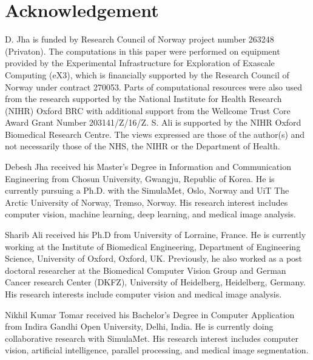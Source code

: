 \documentclass[journal]{IEEEtran}
\begin{document}
\section*{Acknowledgement}
D. Jha is funded by  Research Council of Norway project number 263248 (Privaton). The computations in this paper were performed on equipment provided by the Experimental Infrastructure for Exploration of Exascale Computing (eX3), which is financially supported by the Research Council of Norway under contract 270053. Parts of computational resources were also used from the research supported by the National Institute for Health Research (NIHR) Oxford BRC with additional support from the Wellcome Trust Core Award Grant Number 203141/Z/16/Z. S. Ali is supported by the NIHR Oxford Biomedical Research Centre. The views expressed are those of the author(s) and not necessarily those of the NHS, the NIHR or the Department of Health. 



\begin{IEEEbiography}{Debesh Jha}  received his Master's Degree in Information and Communication Engineering from Chosun University, Gwangju, Republic of Korea. He is currently pursuing a Ph.D. with the SimulaMet, Oslo, Norway and UiT The Arctic University of Norway, Tr{\o}mso, Norway. His research interest includes computer vision, machine learning, deep learning, and medical image analysis.
\end{IEEEbiography}


\begin{IEEEbiography}{Sharib Ali} received his Ph.D from University of Lorraine, France. He is currently working at the Institute of Biomedical Engineering, Department of Engineering Science, University of Oxford, Oxford, UK. Previously, he also worked as a post doctoral researcher at the Biomedical Computer Vision Group and German Cancer research Center (DKFZ), University of Heidelberg, Heidelberg, Germany. His research interests include computer vision and medical image analysis.
\end{IEEEbiography}


\begin{IEEEbiography}{Nikhil Kumar Tomar} received his Bachelor's Degree in Computer Application from Indira Gandhi Open University, Delhi, India. He is currently doing collaborative research with SimulaMet. His research interest includes computer vision,  artificial intelligence, parallel processing, and medical image segmentation.
\end{IEEEbiography}
\end{document}
